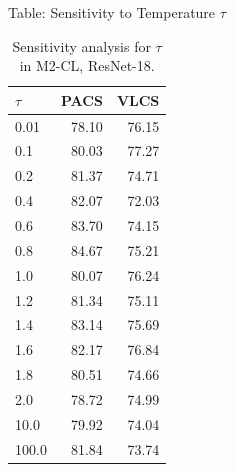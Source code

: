 \documentclass[t, aspectratio=169]{beamer} %
\begin{document}
	\begin{frame}{Table: Sensitivity to Temperature $\tau$}
\begin{table}[htbp]
\centering
\caption{Sensitivity analysis for $\tau$ in M2-CL, ResNet-18.}
\scriptsize
\begin{tabular}{lrr}
\toprule
$\tau$ & PACS & VLCS \\
\midrule
0.01 & 78.10 & 76.15 \\
0.1 & 80.03 & 77.27 \\
0.2 & 81.37 & 74.71 \\
0.4 & 82.07 & 72.03 \\
0.6 & 83.70 & 74.15 \\
0.8 & 84.67 & 75.21 \\
1.0 & 80.07 & 76.24 \\
1.2 & 81.34 & 75.11 \\
1.4 & 83.14 & 75.69 \\
1.6 & 82.17 & 76.84 \\
1.8 & 80.51 & 74.66 \\
2.0 & 78.72 & 74.99 \\
10.0 & 79.92 & 74.04 \\
100.0 & 81.84 & 73.74 \\
\bottomrule
\end{tabular}
\end{table}
	\end{frame}
\end{document}
